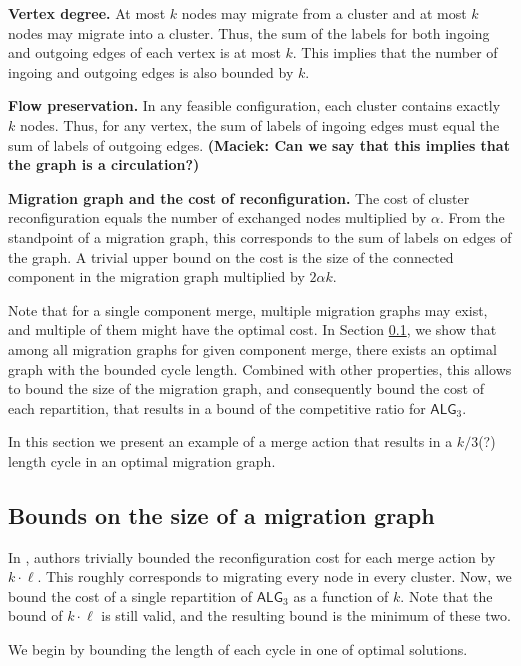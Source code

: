 \documentclass[]{article}
\newcommand{\TAlg}{{\ensuremath{\textsf{ALG}_{3}}}\xspace}
\newcommand\maciek[1]{\color{brown}\textbf{(Maciek: #1)}\color{black}}
\begin{document}
\noindent
\textbf{Vertex degree.}
At most $k$ nodes may migrate from a cluster and at most $k$ nodes may migrate into a cluster.
Thus, the sum of the labels for both ingoing and outgoing edges of each vertex is at most $k$.
This implies that the number of ingoing and outgoing edges is also bounded by $k$.

\noindent
\textbf{Flow preservation.}
In any feasible configuration, each cluster contains exactly $k$ nodes.
Thus, for any vertex, the sum of labels of ingoing edges must equal the sum of labels of outgoing edges.
\maciek{Can we say that this implies that the graph is a circulation?}

\noindent
\textbf{Migration graph and the cost of reconfiguration.}
The cost of cluster reconfiguration equals the number of exchanged nodes multiplied by $\alpha$.
From the standpoint of a migration graph, this corresponds to the sum of labels on edges of the graph.
A trivial upper bound on the cost is the size of the connected component in the migration graph multiplied by $2\alpha k$.

\medskip

Note that for a single component merge, multiple migration graphs may exist, and multiple of them might have the optimal cost.
In Section \ref{ssec:cascade}, we show that among all migration graphs for given component merge, there exists an optimal graph with the bounded cycle length.
Combined with other properties, this allows to bound the size of the migration graph, and consequently bound the cost of each repartition, that results in a bound of the competitive ratio for \TAlg.


In this section we present an example of a merge action that results in a $k/3$(?) length cycle in an optimal migration graph.

\subsection{Bounds on the size of a migration graph}
\label{ssec:cascade}

In \cite{repartition-disc}, authors trivially bounded the reconfiguration cost for each merge action by $k \cdot \ell$.
This roughly corresponds to migrating every node in every cluster.
Now, we bound the cost of a single repartition of \TAlg as a function of $k$.
Note that the bound of $k \cdot \ell$ is still valid, and the resulting bound is the minimum of these two.

We begin by bounding the length of each cycle in one of optimal solutions.
\end{document}
